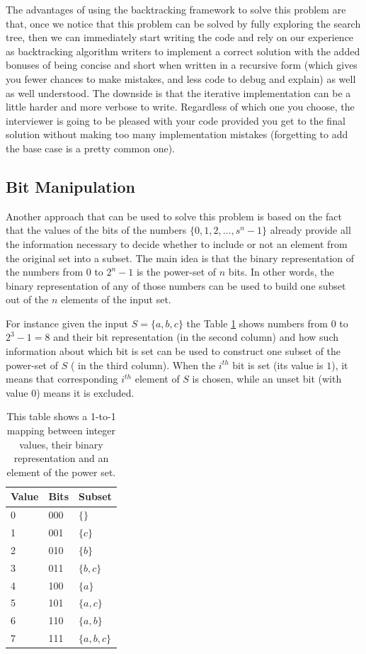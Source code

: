 The advantages of using the backtracking framework to solve this problem are that, once we notice
that this problem can be solved by fully exploring the search tree, then we can immediately
start writing the code and rely on our experience as backtracking algorithm writers to implement a correct
solution with the added bonuses of being concise and short when written in a recursive  form (which gives you fewer chances to make mistakes, and less code to debug and explain)  as well
as well understood.
The downside is that the iterative implementation can be a little harder and more verbose to write.
Regardless of which one you choose, the interviewer is going to be pleased with your code provided you get to the final solution
without making too many implementation mistakes (forgetting to add the base case is a pretty common one).
\subsection{Bit Manipulation}
Another approach that can be used to solve this problem is based on the fact that the values of the
bits of the numbers $\{0,1,2,\ldots, s^n-1\}$  already provide all the information necessary to decide whether to include or not an element from the original set into a subset. 
The main idea is that the binary representation of the numbers from $0$ to $2^{n}-1$ is the power-set of $n$ bits.
In other words, the binary representation of any of those numbers can be used to build one subset out
of the $n$ elements of the input set. 

For instance given the input $S=\{a,b,c\}$ the Table \ref{tab:mapping_value_bits} shows numbers from $0$ to $2^3-1 = 8$ and their bit
representation (in the second column) and how such information about which bit is set can be used to construct one
subset of the power-set of $S$ ( in the third column). When the $i^{th}$ bit is set (its value is $1$), it means that
corresponding $i^{th}$ element of $S$ is chosen, while an unset bit (with value $0$) means it is
excluded.

\begin{table}
    \centering
    \begin{tabular}{|l|l|l|}
        \hline
        Value & Bits & Subset\\ \hline
        0     & 000  & $\{\}$\\ \hline
        1     & 001  & $\{c\}$\\ \hline
        2     & 010  & $\{b\}$\\ \hline
        3     & 011  & $\{b,c\}$\\ \hline
        4     & 100  & $\{a\}$\\ \hline
        5     & 101  & $\{a,c\}$\\ \hline
        6     & 110  & $\{a,b\}$\\ \hline
        7     & 111  & $\{a,b,c\}$ \\ \hline
    \end{tabular}
    \caption[Mapping between bits and element of the power set.]{This table shows a 1-to-1 mapping between integer values, their binary representation and an element of the power set.}
    \label{tab:mapping_value_bits}
\end{table}


